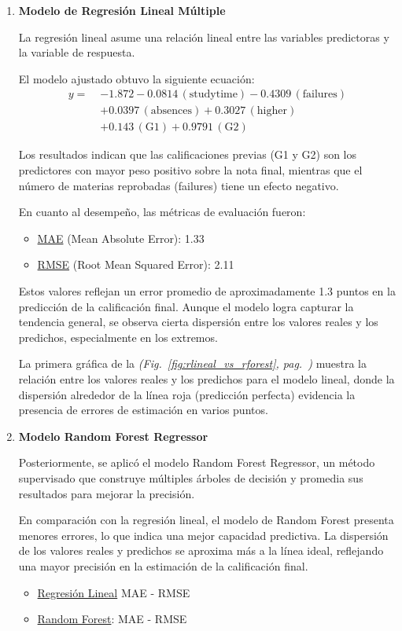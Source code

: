 \documentclass{article}
\begin{document}
\begin{enumerate}
    \item \textbf{Modelo de Regresión Lineal Múltiple}

La regresión lineal asume una relación lineal entre las variables predictoras y la variable de respuesta.
    
    
El modelo ajustado obtuvo la siguiente ecuación:
\begin{align*}
y =\;& -1.872 - 0.0814\,(\text{studytime}) - 0.4309\,(\text{failures}) \\
    & + 0.0397\,(\text{absences}) + 0.3027\,(\text{higher}) \\
    & + 0.143\,(\text{G1}) + 0.9791\,(\text{G2})
\end{align*}

Los resultados indican que las calificaciones previas (G1 y G2) son los predictores con mayor peso positivo sobre la nota final, mientras que el número de materias reprobadas (failures) tiene un efecto negativo.

En cuanto al desempeño, las métricas de evaluación fueron:
\begin{itemize}[label=\--]
    \item \underline{MAE} (Mean Absolute Error): 1.33
    \item \underline{RMSE} (Root Mean Squared Error): 2.11
\end{itemize}

Estos valores reflejan un error promedio de aproximadamente 1.3 puntos en la predicción de la calificación final. Aunque el modelo logra capturar la tendencia general, se observa cierta dispersión entre los valores reales y los predichos, especialmente en los extremos.

La primera gráfica de la {\textit{(Fig.~\ref{fig:rlineal_vs_rforest}, pag.~\pageref{fig:rlineal_vs_rforest})}} muestra la relación entre los valores reales y los predichos para el modelo lineal, donde la dispersión alrededor de la línea roja (predicción perfecta) evidencia la presencia de errores de estimación en varios puntos.

\item \textbf{Modelo Random Forest Regressor}

Posteriormente, se aplicó el modelo Random Forest Regressor, un método supervisado que construye múltiples árboles de decisión y promedia sus resultados para mejorar la precisión. 


En comparación con la regresión lineal, el modelo de Random Forest presenta menores errores, lo que indica una mejor capacidad predictiva. La dispersión de los valores reales y predichos se aproxima más a la línea ideal, reflejando una mayor precisión en la estimación de la calificación final.


\begin{itemize}[label=\--]
    \item \underline{Regresión Lineal} MAE  - RMSE 
    \item \underline{Random Forest}: MAE  - RMSE 
\end{itemize}
\end{enumerate}
\end{document}
